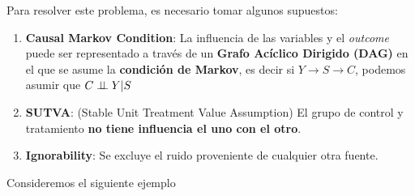 Para resolver este problema, es necesario tomar algunos supuestos: 
\begin{enumerate}
    \item \textbf{Causal Markov Condition}: La influencia de las variables y el \textit{outcome} puede ser representado a través de un \textbf{Grafo Acíclico Dirigido (DAG)} en el que se asume la \textbf{condición de Markov}, es decir si $Y \rightarrow S \rightarrow C$, podemos asumir que $C \perp \!\!\! \perp Y | S$
    \item \textbf{SUTVA}: (Stable Unit Treatment Value Assumption) El grupo de control y tratamiento \textbf{no tiene influencia el uno con el otro}. 
    \item \textbf{Ignorability}: Se excluye el ruido proveniente de cualquier otra fuente. 
\end{enumerate}

Consideremos el siguiente ejemplo 









